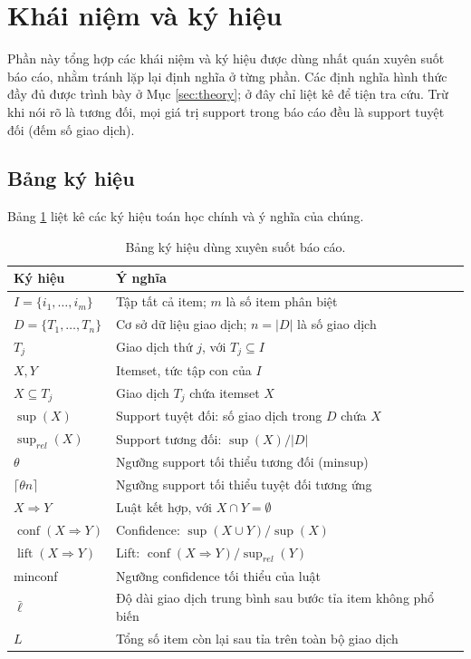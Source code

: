 \section{Khái niệm và ký hiệu}
\label{sec:notation}

Phần này tổng hợp các khái niệm và ký hiệu được dùng nhất quán xuyên suốt báo cáo, nhằm tránh lặp lại định nghĩa ở từng phần. Các định nghĩa hình thức đầy đủ được trình bày ở Mục \ref{sec:theory}; ở đây chỉ liệt kê để tiện tra cứu. Trừ khi nói rõ là tương đối, mọi giá trị support trong báo cáo đều là support tuyệt đối (đếm số giao dịch).

\subsection{Bảng ký hiệu}

Bảng \ref{tab:notation} liệt kê các ký hiệu toán học chính và ý nghĩa của chúng.

\begin{table}[H]
    \centering
    \caption{Bảng ký hiệu dùng xuyên suốt báo cáo.}
    \label{tab:notation}
    \begin{tabular}{l p{10.5cm}}
        \toprule
        Ký hiệu & Ý nghĩa \\
        \midrule
        $I = \{i_1, \ldots, i_m\}$ & Tập tất cả item; $m$ là số item phân biệt \\
        $D = \{T_1, \ldots, T_n\}$ & Cơ sở dữ liệu giao dịch; $n = |D|$ là số giao dịch \\
        $T_j$ & Giao dịch thứ $j$, với $T_j \subseteq I$ \\
        $X, Y$ & Itemset, tức tập con của $I$ \\
        $X \subseteq T_j$ & Giao dịch $T_j$ chứa itemset $X$ \\
        $\operatorname{sup}(X)$ & Support tuyệt đối: số giao dịch trong $D$ chứa $X$ \\
        $\operatorname{sup}_{rel}(X)$ & Support tương đối: $\operatorname{sup}(X) / |D|$ \\
        $\theta$ & Ngưỡng support tối thiểu tương đối (minsup) \\
        $\lceil \theta n \rceil$ & Ngưỡng support tối thiểu tuyệt đối tương ứng \\
        $X \Rightarrow Y$ & Luật kết hợp, với $X \cap Y = \emptyset$ \\
        $\operatorname{conf}(X \Rightarrow Y)$ & Confidence: $\operatorname{sup}(X \cup Y) / \operatorname{sup}(X)$ \\
        $\operatorname{lift}(X \Rightarrow Y)$ & Lift: $\operatorname{conf}(X \Rightarrow Y) / \operatorname{sup}_{rel}(Y)$ \\
        minconf & Ngưỡng confidence tối thiểu của luật \\
        $\bar{\ell}$ & Độ dài giao dịch trung bình sau bước tỉa item không phổ biến \\
        $L$ & Tổng số item còn lại sau tỉa trên toàn bộ giao dịch \\
        \bottomrule
    \end{tabular}
\end{table}

